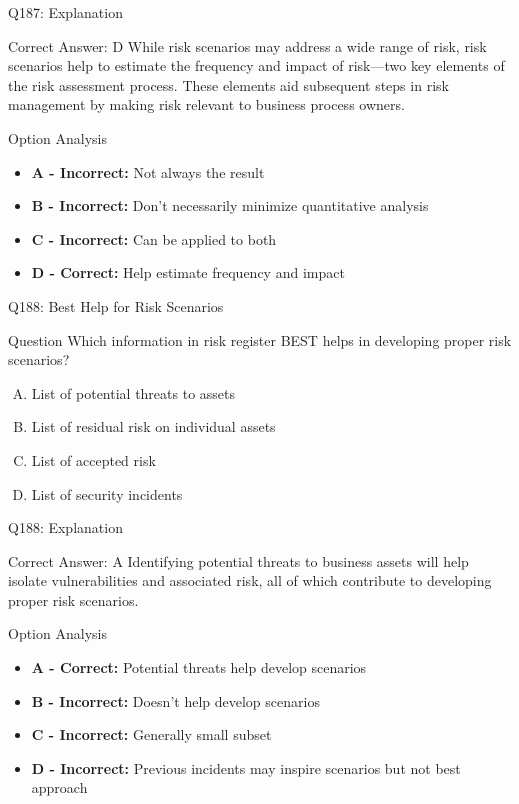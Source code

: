 \documentclass{beamer}
\begin{document}
	\begin{frame}{Q187: Explanation}
		\begin{block}{Correct Answer: D}
			While risk scenarios may address a wide range of risk, risk scenarios help to estimate the frequency and impact of risk—two key elements of the risk assessment process. These elements aid subsequent steps in risk management by making risk relevant to business process owners.
		\end{block}
		\begin{block}{Option Analysis}
			\begin{itemize}
				\item \textbf{A - Incorrect:} Not always the result
				\item \textbf{B - Incorrect:} Don't necessarily minimize quantitative analysis
				\item \textbf{C - Incorrect:} Can be applied to both
				\item \textbf{D - Correct:} Help estimate frequency and impact
			\end{itemize}
		\end{block}
	\end{frame}
	
	\begin{frame}{Q188: Best Help for Risk Scenarios}
		\begin{block}{Question}
			Which information in risk register BEST helps in developing proper risk scenarios?
		\end{block}
		\begin{enumerate}[(A)]
			\item List of potential threats to assets
			\item List of residual risk on individual assets
			\item List of accepted risk
			\item List of security incidents
		\end{enumerate}
	\end{frame}
	
	\begin{frame}{Q188: Explanation}
		\begin{block}{Correct Answer: A}
			Identifying potential threats to business assets will help isolate vulnerabilities and associated risk, all of which contribute to developing proper risk scenarios.
		\end{block}
		\begin{block}{Option Analysis}
			\begin{itemize}
				\item \textbf{A - Correct:} Potential threats help develop scenarios
				\item \textbf{B - Incorrect:} Doesn't help develop scenarios
				\item \textbf{C - Incorrect:} Generally small subset
				\item \textbf{D - Incorrect:} Previous incidents may inspire scenarios but not best approach
			\end{itemize}
		\end{block}
	\end{frame}
	
\end{document}
